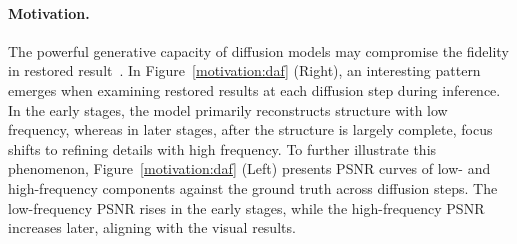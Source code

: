 \paragraph{Motivation.}
The powerful generative capacity of diffusion models may compromise the fidelity in restored result~\cite{wu2024seesr, yu2024scaling}. 
In Figure~\ref{motivation:daf} (Right), an interesting pattern emerges when examining restored results at each diffusion step during inference. 
In the early stages, the model primarily reconstructs structure with low frequency, whereas in later stages, after the structure is largely complete, focus shifts to refining details with high frequency. 
To further illustrate this phenomenon, Figure~\ref{motivation:daf} (Left) presents PSNR curves of low- and high-frequency components against the ground truth across diffusion steps. 
The low-frequency PSNR rises in the early stages, while the high-frequency PSNR increases later, aligning with the visual results.


